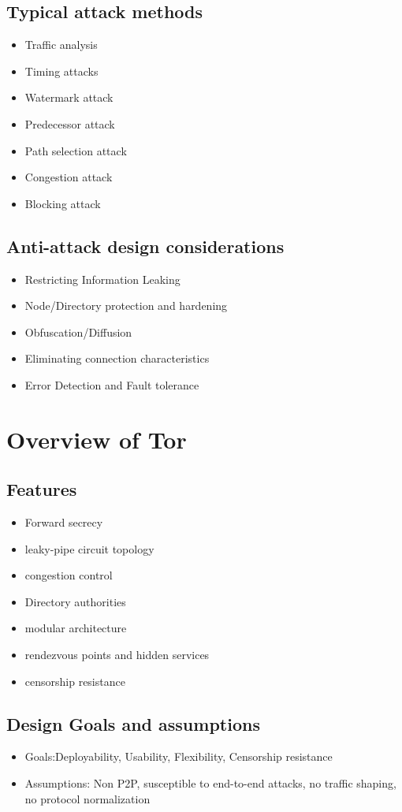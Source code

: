 \documentclass{llncs}
\begin{document}
\subsection{Typical attack methods}
\begin{itemize}
	\item{Traffic analysis}
	\item{Timing attacks}
	\item{Watermark attack}
	\item{Predecessor attack}
	\item{Path selection attack}
	\item{Congestion attack}
	\item{Blocking attack}
\end{itemize}
\subsection{Anti-attack design considerations}
\begin{itemize}
	\item{Restricting Information Leaking}
	\item{Node/Directory protection and hardening}
	\item{Obfuscation/Diffusion}
	\item{Eliminating connection characteristics}
	\item{Error Detection and Fault tolerance}
\end{itemize}


\section{Overview of Tor} \label{tor}
\subsection{Features}
\begin{itemize}
	\item{Forward secrecy}
	\item{leaky-pipe circuit topology}
	\item{congestion control}
	\item{Directory authorities}
	\item{modular architecture}
	\item{rendezvous points and hidden services}
	\item{censorship resistance}
\end{itemize}
\subsection{Design Goals and assumptions}
\begin{itemize}
	\item{Goals:Deployability, Usability, Flexibility, Censorship resistance}
	\item{Assumptions: Non P2P, susceptible to end-to-end attacks, no traffic shaping, no protocol normalization}
\end{itemize}
\end{document}
